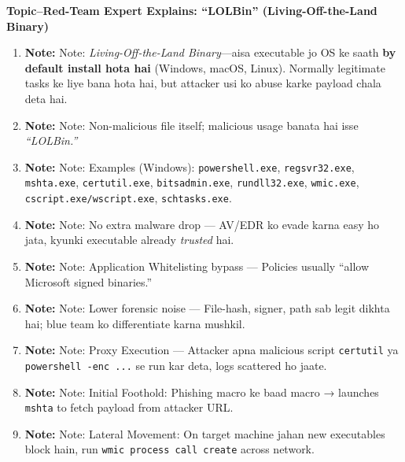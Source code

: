 \documentclass[a4paper,12pt]{article}
\begin{document}
\begin{center}
  \Huge\bfseries\color{titleblue}Topic--Red-Team Expert Explains: “LOLBin” (Living-Off-the-Land Binary)
\end{center}

\vspace{1em}

\begin{enumerate}[leftmargin=*,itemsep=0.5em]

  \item \textbf{Note:}\color{notered} Note: \color{black} \textit{Living-Off-the-Land Binary}—aisa executable jo OS ke saath \textbf{by default install hota hai} (Windows, macOS, Linux). Normally legitimate tasks ke liye bana hota hai, but attacker usi ko abuse karke payload chala deta hai.
  \item \textbf{Note:}\color{notered} Note: \color{black} Non-malicious file itself; malicious usage banata hai isse \textit{“LOLBin.”}
  \item \textbf{Note:}\color{notered} Note: \color{black} Examples (Windows): \texttt{powershell.exe}, \texttt{regsvr32.exe}, \texttt{mshta.exe}, \texttt{certutil.exe}, \texttt{bitsadmin.exe}, \texttt{rundll32.exe}, \texttt{wmic.exe}, \texttt{cscript.exe/wscript.exe}, \texttt{schtasks.exe}.
  \item \textbf{Note:}\color{notered} Note: \color{black} No extra malware drop — AV/EDR ko evade karna easy ho jata, kyunki executable already \textit{trusted} hai.
  \item \textbf{Note:}\color{notered} Note: \color{black} Application Whitelisting bypass — Policies usually “allow Microsoft signed binaries.”
  \item \textbf{Note:}\color{notered} Note: \color{black} Lower forensic noise — File-hash, signer, path sab legit dikhta hai; blue team ko differentiate karna mushkil.
  \item \textbf{Note:}\color{notered} Note: \color{black} Proxy Execution — Attacker apna malicious script \texttt{certutil} ya \texttt{powershell -enc ...} se run kar deta, logs scattered ho jaate.
  \item \textbf{Note:}\color{notered} Note: \color{black} Initial Foothold: Phishing macro ke baad macro → launches \texttt{mshta} to fetch payload from attacker URL.
  \item \textbf{Note:}\color{notered} Note: \color{black} Lateral Movement: On target machine jahan new executables block hain, run \texttt{wmic process call create} across network.
    \begin{tcolorbox}[colback=codebg, boxrule=0.5pt, arc=4pt, boxsep=5pt]

\end{tcolorbox}
\end{enumerate}
\end{document}
